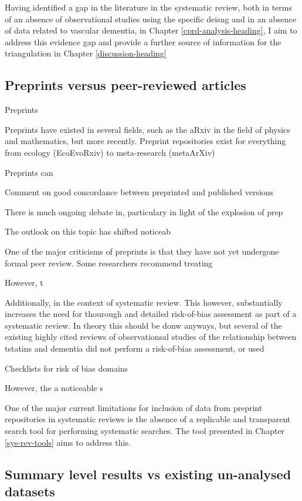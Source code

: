 \documentclass[a4paper,nobind]{templates/ociamthesis}
\begin{document}
Having identified a gap in the literature in the systematic review, both in terms of an absence of observational studies using the specific deisng and in an absence of data related to vascular dementia, in Chapter \ref{cprd-analysis-heading}, I aim to address this evidence gap and provide a further source of information for the triangulation in Chapter \ref{discussion-heading}

\hypertarget{preprints-versus-peer-reviewed-articles}{%
\subsection{Preprints versus peer-reviewed articles}\label{preprints-versus-peer-reviewed-articles}}

Preprints

Preprints have existed in several fields, such as the aRxiv in the field of physics and mathematics, but more recently. Preprint repositories exist for everything from ecology (EcoEvoRxiv) to meta-research (metaArXiv)

Preprints can

Comment on good concordance between preprinted and published versions

There is much ongoing debate in, particulary in light of the explosion of prep

The outlook on this topic has shifted noticeab

One of the major criticisms of preprints is that they have not yet undergone formal peer review. Some researchers recommend treating

However, t

Additionally, in the context of systematic review. This however, substantially increases the need for thourough and detailed risk-of-bias assessment as part of a systematic review. In theory this should be donw anyways, but several of the existing highly cited reviews of observationsal studies of the relationship between tstatins and dementia did not perform a risk-of-bias assessment, or used

Checklists for risk of bias domains

However, the a noticeable s

One of the major current limitations for inclusion of data from preprint repositories in systematic reviews is the absence of a replicable and transparent search tool for performing systematic searches. The tool presented in Chapter \ref{sys-rev-tools} aims to address this.

\hypertarget{summary-level-results-vs-existing-un-analysed-datasets}{%
\subsection{Summary level results vs existing un-analysed datasets}\label{summary-level-results-vs-existing-un-analysed-datasets}}
\end{document}
